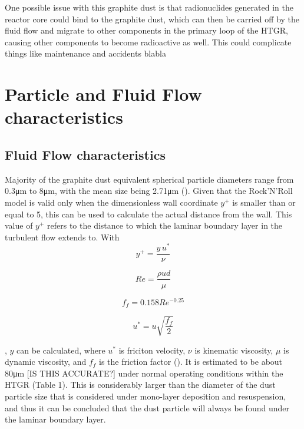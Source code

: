 \documentclass{article}
\begin{document}
One possible issue with this graphite dust is that radionuclides generated in the reactor core could bind to the graphite dust, which can then be carried off by the fluid flow and migrate to other components in the primary loop of the HTGR, causing other components to become radioactive as well. This could complicate things like maintenance and accidents blabla

\section{Particle and Fluid Flow characteristics}

\subsection{Fluid Flow characteristics}

Majority of the graphite dust equivalent spherical particle diameters range from 0.3μm to 8μm, with the mean size being 2.71μm (\cite{PENG2013785}). Given that the Rock'N'Roll model is valid only when the dimensionless wall coordinate $y^+$ is smaller than or equal to 5, this can be used to calculate the actual distance from the wall. This value of $y^+$ refers to the distance to which the laminar boundary layer in the turbulent flow extends to. 
With 
\begin{equation}\label{1}
    y^+ = \frac{y \,u^*}{\nu}
\end{equation}

\begin{equation}\label{2}
    Re = \frac{\rho ud}{\mu}
\end{equation}

\begin{equation}\label{3}
    f_f = 0.158 Re^{-0.25}
\end{equation}

\begin{equation}\label{4}
    u^* = u \sqrt{\frac{f_f}{2}}
\end{equation}

,  \( y \) can be calculated, where \(u^*\) is friciton velocity, \(\nu\) is kinematic viscosity, \(\mu\) is dynamic viscosity, and \(f_f\) is the friction factor (\cite{Chanson09}). It is estimated to be about 80μm [IS THIS ACCURATE?] under normal operating conditions within the HTGR (Table 1). This is considerably larger than the diameter of the dust particle size that is considered under mono-layer deposition and resuspension, and thus it can be concluded that the dust particle will always be found under the laminar boundary layer. 
\end{document}
